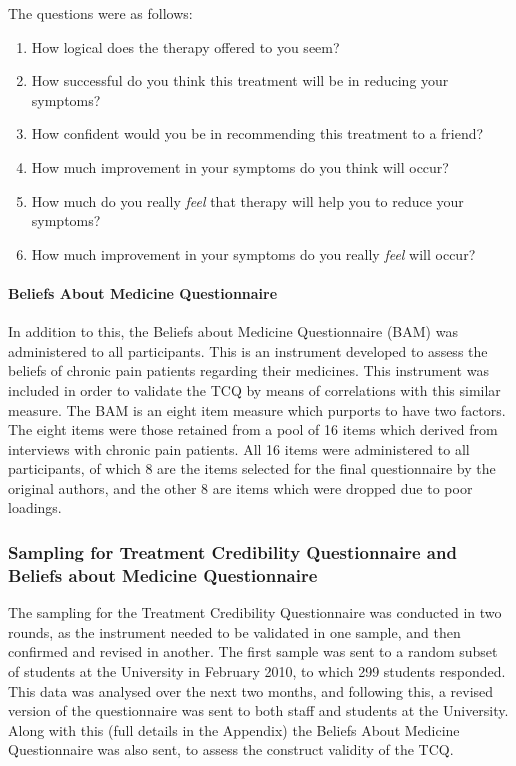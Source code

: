 The questions were as follows:


\begin{enumerate}
	\item How logical does the therapy offered to you seem?
	\item How successful do you think this treatment will be in reducing your symptoms?
 	\item How confident would you be in recommending this treatment to a friend?
	\item How much improvement in your symptoms do you think will occur?
	\item How much do you really \textit{feel} that therapy will help you to reduce your symptoms?
	\item How much improvement in your symptoms do you really \textit{feel} will occur?
\end{enumerate}

\paragraph{Beliefs About Medicine Questionnaire}

In addition to this, the Beliefs about Medicine Questionnaire (BAM) was administered to all participants. This is an instrument developed to assess the beliefs of chronic pain patients regarding their medicines\cite{Horne1999}. This instrument was included in order to validate the TCQ by means of correlations with this similar measure. The BAM is an eight item measure which purports to have two factors. The eight items were those retained from a pool of 16 items which derived from interviews with chronic pain patients. All 16 items were administered to all participants, of which 8 are the items selected for the final questionnaire by the original authors, and the other 8 are items which were dropped due to poor loadings.

\subsubsection{Sampling for Treatment Credibility Questionnaire and Beliefs about Medicine Questionnaire}

The sampling for the Treatment Credibility Questionnaire was conducted in two rounds, as the instrument needed to be validated in one sample, and then confirmed and revised in another. The first sample was sent to a random subset of students at the University in February 2010, to which 299 students responded. This data was analysed over the next two months, and following this, a revised version of the questionnaire was sent to both staff and students at the University. Along with this (full details in the Appendix) the Beliefs About Medicine Questionnaire was also sent, to assess the construct validity of the TCQ.

